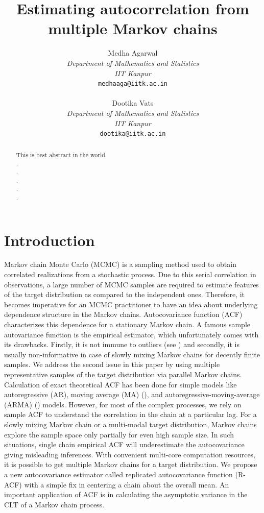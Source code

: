 \documentclass[12pt]{article}
\title{Estimating autocorrelation from multiple Markov chains}
\author{
  Medha Agarwal \\
  \textit{Department of Mathematics and Statistics}\\
  \textit{IIT Kanpur}\\
  \texttt{medhaaga@iitk.ac.in} \\\\
 Dootika Vats \\
  \textit{Department of Mathematics and Statistics}\\
  \textit{IIT Kanpur}\\
  \texttt{dootika@iitk.ac.in} \\
}
\begin{document}
\maketitle


\begin{abstract}
    This is best abstract in the world.\\.\\.\\.\\.\\.
\end{abstract}


\section{Introduction} \label{sec:intro}

Markov chain Monte Carlo (MCMC) is a sampling method used to obtain correlated realizations from a stochastic process. Due to this serial correlation in observations, a large number of MCMC samples are required to estimate features of the target distribution as compared to the independent ones. Therefore, it becomes imperative for an MCMC practitioner to have an idea about underlying dependence structure in the Markov chains. Autocovariance function (ACF) characterizes this dependence for a stationary Markov chain. A famous sample autovariance function is the empirical estimator, which unfortunately comes with its drawbacks. Firstly, it is not immune to outliers (see \cite{ma2000highly}) and secondly, it is usually non-informative in case of slowly mixing Markov chains for decently finite samples. We address the second issue in this paper by using multiple representative samples of the target distribution via parallel Markov chains.\\

Calculation of exact theoretical ACF has been done for simple models like autoregressive (AR), moving average (MA) (\cite{quenouille1947notes}), and autoregressive-moving-average (ARMA) (\cite{box2015time}) models. However, for most of the complex processes, we rely on sample ACF to understand the correlation in the chain at a particular lag. For a slowly mixing Markov chain or a multi-modal target distribution, Markov chains explore the sample space only partially for even high sample size. In such situations, single chain empirical ACF will underestimate the autocovariance giving misleading inferences. With convenient multi-core computation resources, it is possible to get multiple Markov chains for a target distribution.  We propose a new autocovariance estimator called replicated autocovariance function (R-ACF) with a simple fix in centering a chain about the overall mean. An important application of ACF is in calculating the asymptotic variance in the CLT of a Markov chain process.   \\
\end{document}
